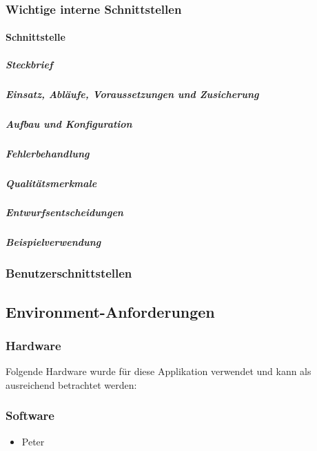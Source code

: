 \subsubsection{Wichtige interne Schnittstellen}
\paragraph{Schnittstelle}
\subparagraph{Steckbrief}

\subparagraph{Einsatz, Abläufe, Voraussetzungen und Zusicherung}

\subparagraph{Aufbau und Konfiguration}

\subparagraph{Fehlerbehandlung}

\subparagraph{Qualitätsmerkmale}
\subparagraph{Entwurfsentscheidungen}

\subparagraph{Beispielverwendung}

\subsubsection{Benutzerschnittstellen}

\subsection{Environment-Anforderungen}\label{environmentanforderungen}

\subsubsection{Hardware}
Folgende Hardware wurde für diese Applikation verwendet und kann als ausreichend betrachtet werden:

\subsubsection{Software}

\begin{itemize}
	\item Peter
\end{itemize}
\newpage